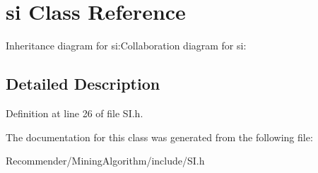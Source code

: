 \section{si Class Reference}
\label{classbr_1_1ufscar_1_1lince_1_1ginga_1_1recommender_1_1si}
Inheritance diagram for si:Collaboration diagram for si:

\subsection{Detailed Description}




Definition at line 26 of file SI.h.

The documentation for this class was generated from the following file:\begin{CompactItemize}
\item 
Recommender/MiningAlgorithm/include/SI.h\end{CompactItemize}
